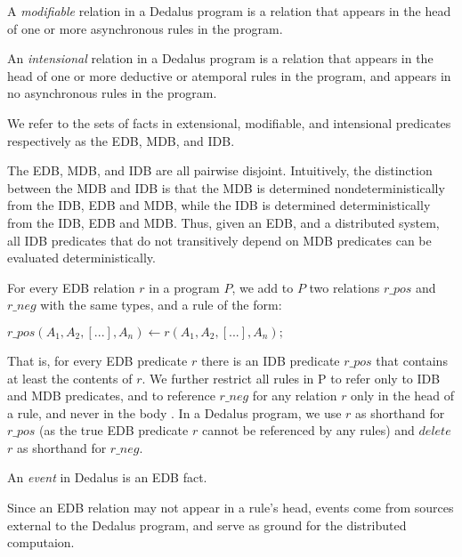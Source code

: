 \documentclass{acm_proc_article-sp-sigmod09}
\newcommand{\wrm}[1]{{\color{BurntOrange}{#1 -- wrm}}}
\begin{document}
\begin{definition}
%
A \emph{modifiable} relation in a Dedalus program is a relation that appears in
the head of one or more asynchronous rules in the program.
%
\end{definition}

 \begin{definition}
%
An \emph{intensional} relation in a Dedalus program is a relation that appears
in the head of one or more deductive or atemporal rules in the program, and
appears in no asynchronous rules in the program.
%
\end{definition}

We refer to the sets of facts in extensional, modifiable, and intensional
predicates respectively as the EDB, MDB, and IDB.

The EDB, MDB, and IDB are all pairwise disjoint.  Intuitively, the distinction
between the MDB and IDB is that the MDB is determined nondeterministically from
the IDB, EDB and MDB, while the IDB is determined deterministically from the
IDB, EDB and MDB.  Thus, given an EDB, and a distributed system, all IDB
predicates that do not transitively depend on MDB predicates can be evaluated
deterministically.

For every EDB relation $r$ in a program $P$, we add to $P$ two relations
$r\_pos$ and $r\_neg$ with the same types, and a rule of the form:

$r\_pos(A_1, A_2, [...], A_n) \leftarrow r(A_1, A_2, [...], A_n);$

\wrm{Are we missing the time suffixes here?} That is, for every EDB predicate
$r$ there is an IDB predicate $r\_pos$ that contains at least the contents of
$r$.  We further restrict all rules in P to refer only to IDB and MDB
predicates, and to reference $r\_neg$ for any relation $r$ only in the head of
a rule, and never in the body \wrm{then, how do we write persistence rules?}.
In a Dedalus program, we use $r$ as shorthand for $r\_pos$ (as the true EDB
predicate $r$ cannot be referenced by any rules) and $delete$ $r$ as shorthand
for $r\_neg$.

\begin{definition}
%
An \emph{event} in Dedalus is an EDB fact.
%
\end{definition}

Since an EDB relation may not appear in a rule's head, events come from sources
external to the Dedalus program, and serve as ground for the distributed
computaion.
\end{document}
